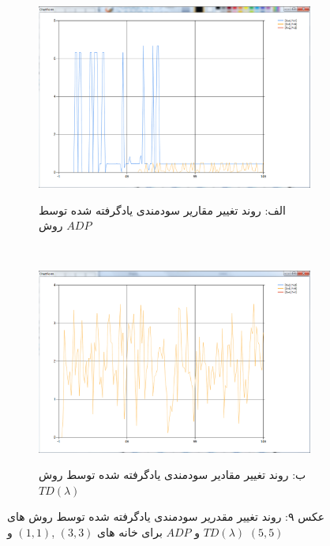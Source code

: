 \documentclass[10pt,a4paper]{article}
\begin{document}
\begin{figure}[h]
        \centering
        \begin{subfigure}[b]{0.5\textwidth}
            \includegraphics[width=\textwidth]{qlambda-adp}
            \begin{center}
                \textarabic{الف: روند تغییر مقاریر سودمندی یادگرفته شده توسط روش $ADP$ }
            \end{center}
        \end{subfigure}%
        ~ %
        \begin{subfigure}[b]{0.5\textwidth}
           \includegraphics[width=\textwidth]{qlambda-td}
            \begin{center}
                \textarabic{ب: روند تغییر مقادیر سودمندی یادگرفته شده توسط روش $TD(\lambda)$ }
            \end{center}
        \end{subfigure}
    \begin{center}
    \textarabic{عکس ۹: روند تغییر مقدریر سودمندی یادگرفته شده توسط روش های
     $TD(\lambda)$ و $ADP$
      برای خانه های 
     $(3,3)$ ,$(1, 1)$ و $(5, 5)$
     }
    \end{center}
\end{figure}
\end{document}
